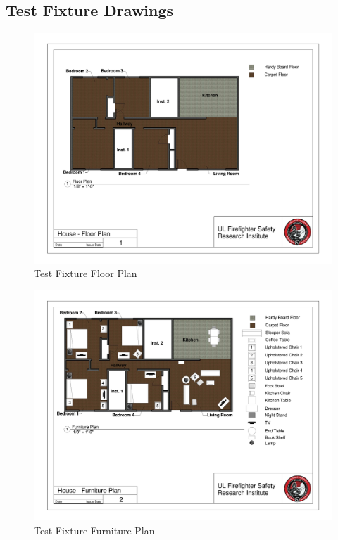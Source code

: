 \documentclass[12pt,oneside]{book}
\begin{document}
\begin{appendices}

\chapter{Test Fixture Drawings}

\begin{figure}
\includegraphics[width=\textheight]{../0_Images/Appendix_Figures/Floor_Plan}
\caption[]{Test Fixture Floor Plan}
\label{fig:appendix_floorplan}
\end{figure}

\begin{figure}
\includegraphics[width=\textheight]{../0_Images/Appendix_Figures/Furniture_Plan}
\caption[]{Test Fixture Furniture Plan}
\label{fig:appendix_furnitureplan}
\end{figure}


\end{appendices}
\end{document}
